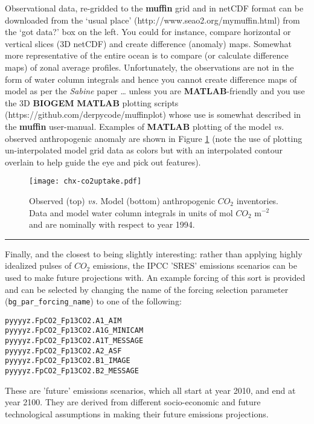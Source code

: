 \documentclass[11pt,fleqn]{book} %
\begin{document}
Observational data, re-gridded to the \textbf{muffin} grid and in netCDF format can be downloaded from the ‘usual place’ (http://www.seao2.org/mymuffin.html) from the ‘got data?’ box on the left. You could for instance, compare horizontal or vertical slices (3D netCDF) and create difference (anomaly) maps. Somewhat more representative of the entire ocean is to compare (or calculate difference maps) of zonal average profiles. Unfortunately, the observations are not in the form of water column integrals and hence you cannot create difference maps of model as per the \textit{Sabine} paper … unless you are \textbf{MATLAB}-friendly and you use the 3D \textbf{BIOGEM} \textbf{MATLAB} plotting scripts (https://github.com/derpycode/muffinplot) whose use is somewhat described in the \textbf{muffin} user-manual. Examples of \textbf{MATLAB} plotting of the model \textit{vs.} observed anthropogenic anomaly are shown in Figure \ref{fig:chx-co2uptake} (note the use of plotting un-interpolated model grid data as colors but with an interpolated contour overlain to help guide the eye and pick out features).

\begin{figure}[ht]
\begin{center}
\texttt{[image: chx-co2uptake.pdf]}
\end{center}
\vspace{-10pt}
\caption{Observed (top) \textit{vs.} Model (bottom) anthropogenic \(CO_{2}\) inventories.
Data and model water column integrals in units of mol \(CO_{2}\) m$^{-2}$ and are nominally with respect to year 1994.}
\label{fig:chx-co2uptake}
\end{figure}

\vspace{1mm}
\noindent\rule{4cm}{0.1mm}
\vspace{2mm}

\noindent Finally, and the closest to being slightly interesting: rather than applying highly idealized pulses  of \(CO_{2}\) emissions, the IPCC 'SRES' emissions scenarios can be used to make future projections with. An example forcing of this sort is provided and can be selected by changing the name of the forcing selection parameter (\texttt{bg\_par\_forcing\_name}) to one of the following:
\vspace{-2pt}\begin{verbatim}
pyyyyz.FpCO2_Fp13CO2.A1_AIM
pyyyyz.FpCO2_Fp13CO2.A1G_MINICAM
pyyyyz.FpCO2_Fp13CO2.A1T_MESSAGE
pyyyyz.FpCO2_Fp13CO2.A2_ASF
pyyyyz.FpCO2_Fp13CO2.B1_IMAGE
pyyyyz.FpCO2_Fp13CO2.B2_MESSAGE
\end{verbatim}\vspace{-2pt}
These are 'future' emissions scenarios, which all start at year 2010, and end at year 2100. They are derived from different socio-economic and future technological assumptions in making their future emissions projections.
\end{document}
